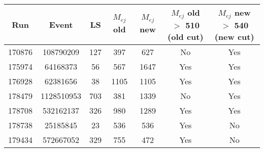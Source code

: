 \documentclass{article}
\begin{document}
\begin{table} 
\begin{tabular}{ | c | c | c | c | c | c | c |}
\hline
\hline
Run & Event & LS & $M_{ej}$ old & $M_{ej}$ new & $M_{ej}$ old $>$ 510 (old cut) & $M_{ej}$ new $>$ 540 (new cut) \\
\hline
\hline
170876 & 108790209 & 127 & 397 & 627 &  No &  Yes \\ 
175974 & 64168373 & 56 & 567 & 1647 &  Yes &  Yes \\ 
176928 & 62381656 & 38 & 1105 & 1105 &  Yes &  Yes \\ 
178479 & 1128510953 & 703 & 381 & 1339 &  No &  Yes \\
178708 & 532162137 & 326 & 980 & 1289 &  Yes &  Yes \\ 
178738 & 25185845 & 23 & 536 & 536 &  Yes &  No \\ 
179434 & 572667052 & 329 & 755 & 472 &  Yes &  No \\ 
\hline
\end{tabular}
\end{table}
\end{document}
